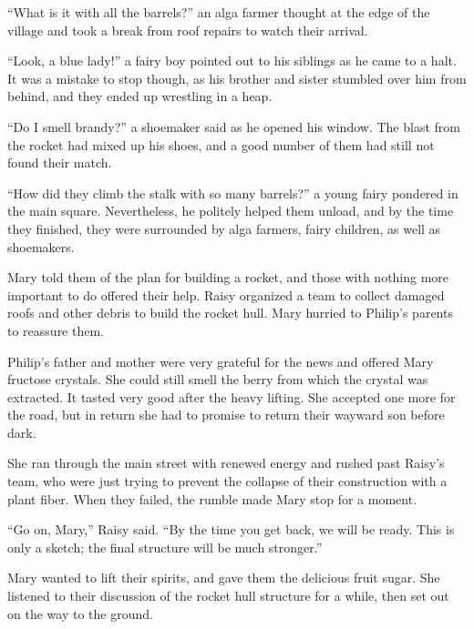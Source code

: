 \documentclass[10pt, draft]{memoir}
\begin{document}
``What is it with all the barrels?'' an alga farmer thought at the edge of the
village and took a break from roof repairs to watch their arrival.

``Look, a blue lady!'' a fairy boy pointed out to his siblings as he came to a
halt. It was a mistake to stop though, as his brother and sister stumbled over
him from behind, and they ended up wrestling in a heap.

``Do I smell brandy?'' a shoemaker said as he opened his window. The blast from
the rocket had mixed up his shoes, and a good number of them had still not
found their match.

``How did they climb the stalk with so many barrels?'' a young fairy pondered
in the main square. Nevertheless, he politely helped them unload, and by the
time they finished, they were surrounded by alga farmers, fairy children, as
well as shoemakers.

Mary told them of the plan for building a rocket, and those with nothing more
important to do offered their help. Raisy organized a team to collect damaged
roofs and other debris to build the rocket hull. Mary hurried to Philip's
parents to reassure them.

Philip's father and mother were very grateful for the news and offered Mary
fructose crystals. She could still smell the berry from which the crystal was
extracted. It tasted very good after the heavy lifting. She accepted one more
for the road, but in return she had to promise to return their wayward son
before dark.

She ran through the main street with renewed energy and rushed past Raisy's
team, who were just trying to prevent the collapse of their construction with a
plant fiber. When they failed, the rumble made Mary stop for a moment.

``Go on, Mary,'' Raisy said. ``By the time you get back, we will be ready. This
is only a sketch; the final structure will be much stronger.''

Mary wanted to lift their spirits, and gave them the delicious fruit sugar. She
listened to their discussion of the rocket hull structure for a while, then set
out on the way to the ground.
\end{document}
